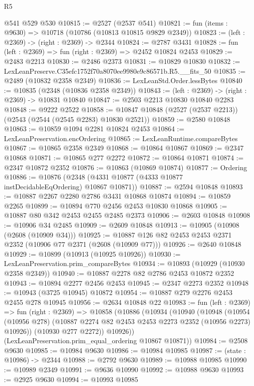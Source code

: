 \begin{lexlean}{R5}
\begin{coremodule}
    @541
    @529
    @530
@10815 := @2527 (@2537 @541)
@10821 := fun (items : @9630) => @10718 (@10786 (@10813 @10815 @9829 @2349))
@10823 := (left : @2369) -> (right : @2369) -> @2344
@10824 := @2787 @3431
@10828 := fun (left : @2369) => fun (right : @2369) => @2452 @10824 @2453
@10829 := @2483 @2213
@10830 := @2486 @2373
@10831 := @10829 @10830
@10832 := LexLeanPreserve.C35efc1752f70a8070ee9980e9c86571b.R5.__fits_50
@10835 := @2489 (@10832 @2358 @2349)
@10836 := LexLeanStd.Order.lessBytes
@10840 := @10835 (@2348 (@10836 @2358 @2349))
@10843 := (left : @2369) -> (right : @2369) -> @10831 @10840
@10847 := @2503 @2213 @10830 @10840 @2283
@10848 := @9222 @2522
@10858 := @10847 @10848 (@2527 (@2537 @2213)) (@2543 (@2544 (@2545 @2283) @10830 @2521))
@10859 := @2580 @10848
@10863 := @10859 @1094 @2281 @10824 @2453
@10864 := LexLeanPreservation.encOrdering
@10865 := LexLeanRuntime.compareBytes
@10867 := @10865 @2358 @2349
@10868 := @10864 @10867
@10869 := @2347 @10868
@10871 := @10865 @277 @2272
@10872 := @10864 @10871
@10874 := @2347 @10872 @2352
@10876 := @10863 (@10869 @10874)
@10877 := Ordering
@10886 := @10876 (@2348 (@4331 @10877 (@4333 @10877 instDecidableEqOrdering) @10867 @10871))
@10887 := @2594 @10848
@10893 := @10887 @2267 @2280 @2786 @3431 @10868 @10874
@10894 := @10859 @2265
@10899 := @10894 @770 @2456 @2453 @10830 @10868
@10905 := @10887 @80 @342 @2453 @2455 @2485 @2373
@10906 := @2603 @10848
@10908 := @10906 @34 @2485
@10909 := @2609 @10848
@10913 := @10905 (@10908 (@2608 (@10909 @34)))
@10925 := @10887 @126 @82 @2453 @2453 @2371 @2352 (@10906 @77 @2371 (@2608 (@10909 @77)))
@10926 := @2640 @10848
@10929 := @10899 (@10913 (@10925 @10926))
@10930 := LexLeanPreservation.prim_compareBytes
@10934 := @10893 (@10929 (@10930 @2358 @2349))
@10940 := @10887 @2278 @82 @2786 @2453 @10872 @2352
@10943 := @10894 @2277 @2456 @2453
@10945 := @2347 @2273 @2352
@10948 := @10943 (@3725 @10945) @10872
@10954 := @10887 @279 @2276 @2453 @2455 @278 @10945
@10956 := @2634 @10848 @22
@10983 := fun (left : @2369) =>
  fun (right : @2369) =>
  @10858
    (@10886
      (@10934
        (@10940
          (@10948
            (@10954 (@10956 @278) (@10887 @2274 @82 @2453 @2453 @2273 @2352 (@10956 @2273) @10926))
            (@10930 @277 @2272))
          @10926))
      (LexLeanPreservation.prim_equal_ordering @10867 @10871))
@10984 := @2508 @9630
@10985 := @10984 @9630
@10986 := @10984 @10985
@10987 := (state : @10986) -> @2344
@10988 := @2792 @9630
@10989 := @10988 @10985
@10990 := @10989 @2349
@10991 := @9636 @10990
@10992 := @10988 @9630
@10993 := @2925 @9630
@10994 := @10993 @10985

\end{coremodule}
\end{lexlean}
